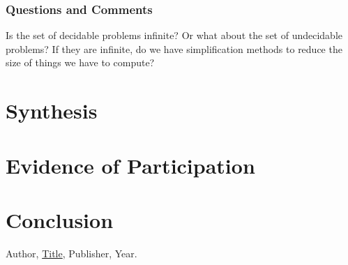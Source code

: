 \documentclass{article}
\theoremstyle{theorem}
\theoremstyle{definition}
\theoremstyle{remark}
\begin{document}
\subsubsection{Questions and Comments}
Is the set of decidable problems infinite? Or what about the set of undecidable problems? If they are infinite, do we have simplification methods to reduce the size of things we have to compute?
\section{Synthesis}

\section{Evidence of Participation}

\section{Conclusion}\label{conclusion}

\begin{thebibliography}{99}
 Author, \href{https://en.wikipedia.org/wiki/LaTeX}{Title}, Publisher, Year.
\end{thebibliography}
\end{document}
